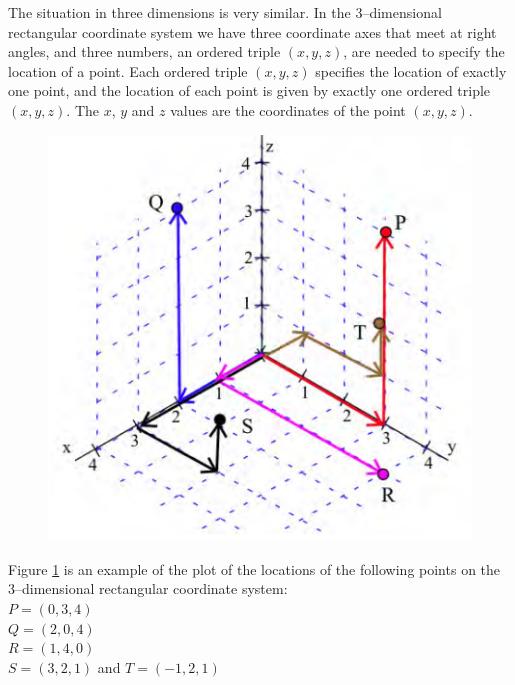 \noindent The situation in three dimensions is very similar. In the 3–dimensional rectangular coordinate system we have three coordinate axes that meet at right angles, and three numbers, an ordered triple $(x, y, z)$, are needed to specify the location of a point. Each ordered triple $(x, y, z)$ specifies the location of exactly one point, and the location of each point is given by exactly one ordered triple $(x, y, z)$. The $x$, $y$ and $z$ values are the coordinates of the point $(x, y, z)$. \\

\begin{figure}

\includegraphics[scale=0.3]{images/twoVariables/3dimEx.png}
\caption{ }
\label{fig:3dimEx}
\end{figure}

\noindent Figure \ref{fig:3dimEx} is an example of the plot of the locations of the following points on the 3–dimensional rectangular coordinate system:\\
$P=(0,3,4)$\\
$Q=(2,0,4)$\\
$R=(1,4,0)$\\
$S=(3,2,1)$ and $T=(-1,2,1)$\\

